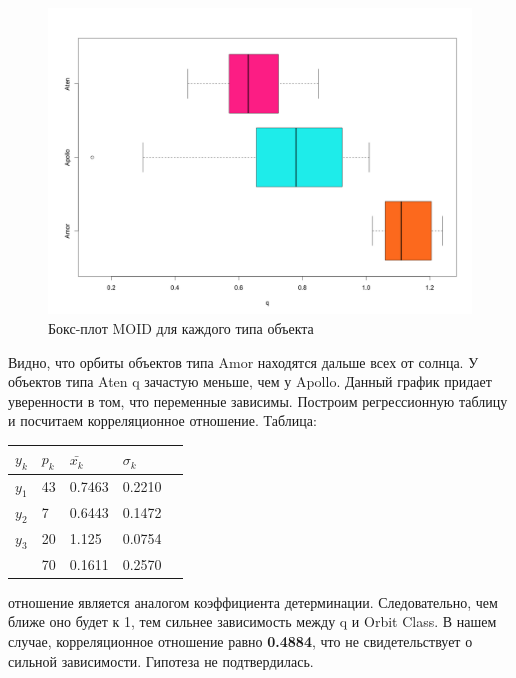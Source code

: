 \documentclass{article}
\begin{document}
\begin{figure}[H] 
\centering
\includegraphics[scale=0.40]{img/4_boxplot.png}
\caption{Бокс-плот MOID для каждого типа объекта}
\label{fig :metka1}
\end{figure}

Видно, что орбиты объектов типа Amor находятся дальше всех от солнца. У объектов типа Aten q зачастую меньше, чем у Apollo. Данный график придает уверенности в том, что переменные зависимы. Построим регрессионную таблицу и посчитаем корреляционное отношение. Таблица:

\begin{center}
  \begin{tabular}{| C{2.5cm} | C{2.5cm} | C{2.5cm} | C{2.5cm} | @{}m{0pt}@{}}
    \hline
    $y_k$ & $p_k$ & $\bar{x_k}$ & $\sigma_k$ & \\[0.5em] \hline
    $y_1$ & 43 & 0.7463 & 0.2210 &\\[0.5em]\hline
    $y_2$ & 7 & 0.6443 & 0.1472 &\\[0.5em]\hline
    $y_3$ & 20 & 1.125 & 0.0754 &\\[0.5em]\hline
    & 70 & 0.1611 & 0.2570 &\\[0.5em]
    \hline
  \end{tabular}
\end{center}

 отношение является аналогом коэффициента детерминации. Следовательно, чем ближе оно будет к 1, тем сильнее зависимость между q и Orbit Class. В нашем случае, корреляционное отношение равно \textbf{0.4884}, что не свидетельствует о сильной зависимости. Гипотеза не подтвердилась. 
\end{document}
